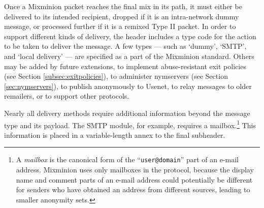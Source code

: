\documentclass[11pt]{IEEEtran}
\begin{document}
Once a Mixminion packet reaches the final mix in its path, it must
either be delivered to its intended recipient, dropped if it is an
intra-network dummy message, or processed further if it is a remixed
Type II packet. In order to support different kinds of
delivery, the header includes a type code for the action to be taken
to deliver the message.  A few types --- such as `dummy', `SMTP', and
`local delivery' --- are specified as a part of the Mixminion
standard.  Others may be added by future extensions, to
implement abuse-resistant exit policies (see Section
\ref{subsec:exitpolicies}), to administer nymservers (see Section
\ref{sec:nymservers}), to publish anonymously to Usenet, to relay
messages to older remailers, or to support other protocols.

Nearly all delivery methods require additional information beyond the
message type and its payload.  The SMTP module, for example, requires
a mailbox.\footnote{A {\it mailbox} is the canonical form of the
``{\tt user@domain}'' part of an e-mail address. Mixminion uses only
mailboxes in the protocol, because the display name and comment parts
of an e-mail address could potentially be different for senders who
have obtained an address from different sources, leading to smaller
anonymity sets.}
This information is placed
in a variable-length annex to the final subheader.

%
%
\end{document}
